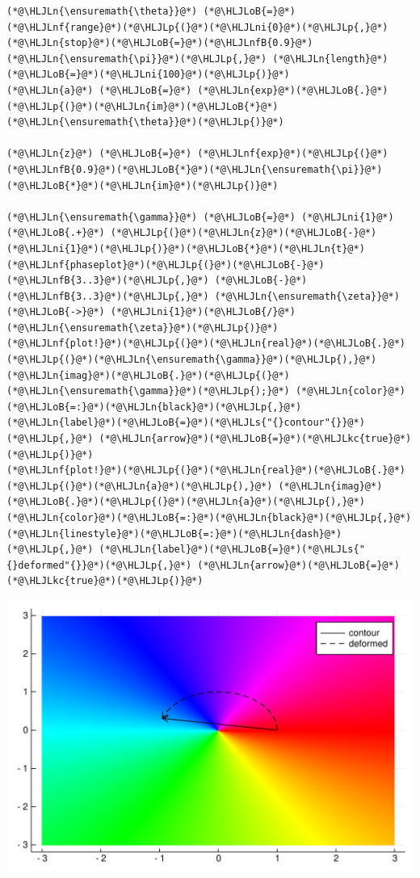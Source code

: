 \documentclass[12pt,a4paper]{article}
\newcommand{\HLJLkc}[1]{\textcolor[RGB]{59,151,46}{\textit{#1}}}
\newcommand{\HLJLn}[1]{#1}
\newcommand{\HLJLnf}[1]{\textcolor[RGB]{66,102,213}{#1}}
\newcommand{\HLJLs}[1]{\textcolor[RGB]{201,61,57}{#1}}
\newcommand{\HLJLnfB}[1]{\textcolor[RGB]{59,151,46}{#1}}
\newcommand{\HLJLni}[1]{\textcolor[RGB]{59,151,46}{#1}}
\newcommand{\HLJLoB}[1]{\textcolor[RGB]{102,102,102}{\textbf{#1}}}
\newcommand{\HLJLp}[1]{#1}
\begin{document}
\begin{lstlisting}
(*@\HLJLn{\ensuremath{\theta}}@*) (*@\HLJLoB{=}@*) (*@\HLJLnf{range}@*)(*@\HLJLp{(}@*)(*@\HLJLni{0}@*)(*@\HLJLp{,}@*) (*@\HLJLn{stop}@*)(*@\HLJLoB{=}@*)(*@\HLJLnfB{0.9}@*)(*@\HLJLn{\ensuremath{\pi}}@*)(*@\HLJLp{,}@*) (*@\HLJLn{length}@*)(*@\HLJLoB{=}@*)(*@\HLJLni{100}@*)(*@\HLJLp{)}@*)
(*@\HLJLn{a}@*) (*@\HLJLoB{=}@*) (*@\HLJLn{exp}@*)(*@\HLJLoB{.}@*)(*@\HLJLp{(}@*)(*@\HLJLn{im}@*)(*@\HLJLoB{*}@*)(*@\HLJLn{\ensuremath{\theta}}@*)(*@\HLJLp{)}@*)

(*@\HLJLn{z}@*) (*@\HLJLoB{=}@*) (*@\HLJLnf{exp}@*)(*@\HLJLp{(}@*)(*@\HLJLnfB{0.9}@*)(*@\HLJLoB{*}@*)(*@\HLJLn{\ensuremath{\pi}}@*)(*@\HLJLoB{*}@*)(*@\HLJLn{im}@*)(*@\HLJLp{)}@*)

(*@\HLJLn{\ensuremath{\gamma}}@*) (*@\HLJLoB{=}@*) (*@\HLJLni{1}@*) (*@\HLJLoB{.+}@*) (*@\HLJLp{(}@*)(*@\HLJLn{z}@*)(*@\HLJLoB{-}@*)(*@\HLJLni{1}@*)(*@\HLJLp{)}@*)(*@\HLJLoB{*}@*)(*@\HLJLn{t}@*)
(*@\HLJLnf{phaseplot}@*)(*@\HLJLp{(}@*)(*@\HLJLoB{-}@*)(*@\HLJLnfB{3..3}@*)(*@\HLJLp{,}@*) (*@\HLJLoB{-}@*)(*@\HLJLnfB{3..3}@*)(*@\HLJLp{,}@*) (*@\HLJLn{\ensuremath{\zeta}}@*) (*@\HLJLoB{->}@*) (*@\HLJLni{1}@*)(*@\HLJLoB{/}@*)(*@\HLJLn{\ensuremath{\zeta}}@*)(*@\HLJLp{)}@*)
(*@\HLJLnf{plot!}@*)(*@\HLJLp{(}@*)(*@\HLJLn{real}@*)(*@\HLJLoB{.}@*)(*@\HLJLp{(}@*)(*@\HLJLn{\ensuremath{\gamma}}@*)(*@\HLJLp{),}@*) (*@\HLJLn{imag}@*)(*@\HLJLoB{.}@*)(*@\HLJLp{(}@*)(*@\HLJLn{\ensuremath{\gamma}}@*)(*@\HLJLp{);}@*) (*@\HLJLn{color}@*)(*@\HLJLoB{=:}@*)(*@\HLJLn{black}@*)(*@\HLJLp{,}@*) (*@\HLJLn{label}@*)(*@\HLJLoB{=}@*)(*@\HLJLs{"{}contour"{}}@*)(*@\HLJLp{,}@*) (*@\HLJLn{arrow}@*)(*@\HLJLoB{=}@*)(*@\HLJLkc{true}@*)(*@\HLJLp{)}@*)
(*@\HLJLnf{plot!}@*)(*@\HLJLp{(}@*)(*@\HLJLn{real}@*)(*@\HLJLoB{.}@*)(*@\HLJLp{(}@*)(*@\HLJLn{a}@*)(*@\HLJLp{),}@*) (*@\HLJLn{imag}@*)(*@\HLJLoB{.}@*)(*@\HLJLp{(}@*)(*@\HLJLn{a}@*)(*@\HLJLp{),}@*) (*@\HLJLn{color}@*)(*@\HLJLoB{=:}@*)(*@\HLJLn{black}@*)(*@\HLJLp{,}@*) (*@\HLJLn{linestyle}@*)(*@\HLJLoB{=:}@*)(*@\HLJLn{dash}@*)(*@\HLJLp{,}@*) (*@\HLJLn{label}@*)(*@\HLJLoB{=}@*)(*@\HLJLs{"{}deformed"{}}@*)(*@\HLJLp{,}@*) (*@\HLJLn{arrow}@*)(*@\HLJLoB{=}@*)(*@\HLJLkc{true}@*)(*@\HLJLp{)}@*)
\end{lstlisting}

\includegraphics[width=\linewidth]{figures/Lecture10_3_1.pdf}
\end{document}
